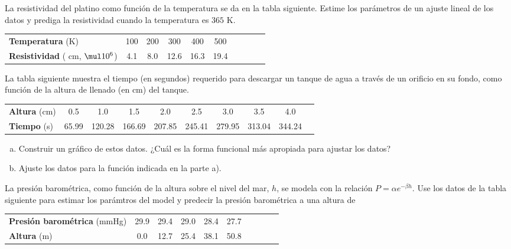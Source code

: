 \documentclass[11pt]{article}
\begin{document}
\begin{question} %
La resistividad del platino como función de la temperatura se da en la tabla siguiente. Estime los parámetros de un ajuste lineal de los datos y prediga la resistividad cuando la temperatura es $365$ K.

\begin{center}
    \begin{tabular}{lccccccccc}
        \toprule
        \textbf{Temperatura} (K) & 100 & 200 & 300 & 400 & 500 \\
        \textbf{Resistividad} (\textohm{} cm, $\mul 10^6$) & 4.1 & 8.0 & 12.6 & 16.3 & 19.4 \\
        \bottomrule
    \end{tabular}
\end{center}
\end{question}

\begin{question} %
La tabla siguiente muestra el tiempo (en segundos) requerido para descargar un tanque de agua a través de un orificio en su fondo, como función de la altura de llenado (en cm) del tanque.
\begin{center}
    \begin{tabular}{lccccccccc}
        \toprule
        \textbf{Altura} (cm) & 0.5 & 1.0 & 1.5 & 2.0 & 2.5 & 3.0 & 3.5 & 4.0 \\
        \textbf{Tiempo} (s) & 65.99 & 120.28 & 166.69 & 207.85 & 245.41 & 279.95 & 313.04 & 344.24 \\
        \bottomrule
    \end{tabular}
\end{center}
\begin{enumerate}[a)]
    \item Construir un gráfico de estos datos. ¿Cuál es la forma funcional más apropiada para ajustar los datos?
    \item Ajuste los datos para la función indicada en la parte a).
\end{enumerate}
\end{question}

\begin{question} %
La presión barométrica, como función de la altura sobre el nivel del mar, $h$, se modela con la relación $P = \alpha e^{-\beta h}$. Use los datos de la tabla siguiente para estimar los parámtros del model y predecir la presión barométrica a una altura de 
\begin{center}
    \begin{tabular}{lccccccccc}
        \toprule
        \textbf{Presión barométrica} (mmHg) & 29.9 & 29.4 & 29.0 & 28.4 & 27.7 \\
        \textbf{Altura} (m) & 0.0 & 12.7 & 25.4 & 38.1 & 50.8 \\
        \bottomrule
    \end{tabular}
\end{center}
\end{question}
\end{document}
